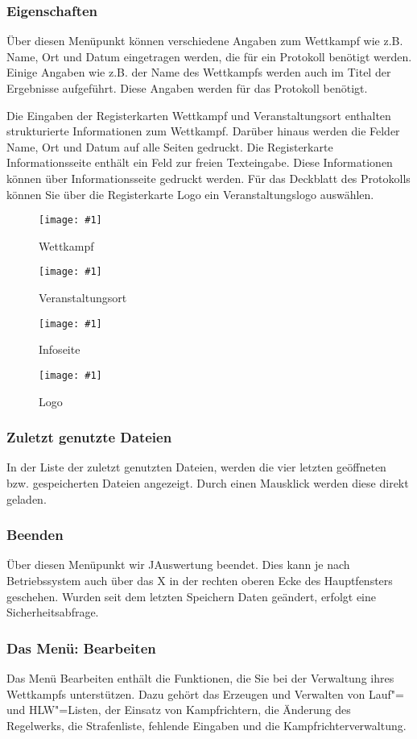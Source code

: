\documentclass[11pt,a4paper,twoside,ngerman]{article}
\newcommand{\hsmimage}[3]{\begin{figure}[!ht]\centering\texttt{[image: \#1]}\caption{#3}\end{figure}}
\begin{document}
\subsubsection*{Eigenschaften}
\label{lbl:jauswertungmenus:eigenschaften}Über diesen Menüpunkt können verschiedene Angaben zum Wettkampf wie z.B. Name, Ort und Datum eingetragen werden, die für ein Protokoll benötigt werden. Einige Angaben wie z.B. der Name des Wettkampfs werden auch im Titel der Ergebnisse aufgeführt. Diese Angaben werden für das Protokoll benötigt.

Die Eingaben der Registerkarten \glqq{}Wettkampf\grqq{} und \glqq{}Veranstaltungsort\grqq{} enthalten strukturierte Informationen zum Wettkampf. Darüber hinaus werden die Felder \glqq{}Name\grqq{}, \glqq{}Ort\grqq{} und \glqq{}Datum\grqq{} auf alle Seiten gedruckt. Die Registerkarte \glqq{}Informationsseite\grqq{} enthält ein Feld zur freien Texteingabe. Diese Informationen können über \glqq{}Informationsseite\grqq{} gedruckt werden. Für das Deckblatt des Protokolls können Sie über die Registerkarte \glqq{}Logo\grqq{} ein Veranstaltungslogo auswählen.


\hsmimage{pics/eigenschaften-wettkampf}{.62\textwidth}{Wettkampf}

\hsmimage{pics/eigenschaften-veranstaltungsort}{.62\textwidth}{Veranstaltungsort}

\hsmimage{pics/eigenschaften-infoseite}{.62\textwidth}{Infoseite}

\hsmimage{pics/eigenschaften-logo}{.62\textwidth}{Logo}

\subsubsection*{Zuletzt genutzte Dateien}
In der Liste der zuletzt genutzten Dateien, werden die vier letzten geöffneten bzw. gespeicherten Dateien angezeigt. Durch einen Mausklick werden diese direkt geladen.


\subsubsection*{Beenden}
Über diesen Menüpunkt wir JAuswertung beendet. Dies kann je nach Betriebssystem auch über das \glqq{}X\grqq{} in der rechten oberen Ecke des Hauptfensters geschehen. Wurden seit dem letzten Speichern Daten geändert, erfolgt eine Sicherheitsabfrage.


\subsubsection*{Das Menü: Bearbeiten}
Das Menü \glqq{}Bearbeiten\grqq{} enthält die Funktionen, die Sie bei der Verwaltung ihres Wettkampfs unterstützen. Dazu gehört das Erzeugen und Verwalten von Lauf"= und HLW"=Listen, der Einsatz von Kampfrichtern, die Änderung des Regelwerks, die Strafenliste, fehlende Eingaben und die Kampfrichterverwaltung.
\end{document}
